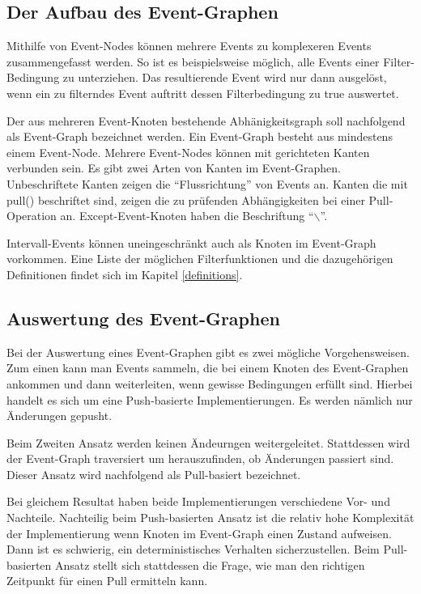 \subsection{Der Aufbau des Event-Graphen}
Mithilfe von Event-Nodes können mehrere Events zu komplexeren Events
zusammengefasst werden. So ist es beispielsweise möglich, alle Events einer
Filter-Bedingung zu unterziehen. Das resultierende Event wird nur dann
ausgelöst, wenn ein zu filterndes Event auftritt dessen Filterbedingung zu true
auswertet. 

Der aus mehreren Event-Knoten bestehende Abhänigkeitsgraph soll nachfolgend als Event-Graph bezeichnet werden. Ein Event-Graph besteht aus mindestens einem Event-Node. 
Mehrere Event-Nodes können mit gerichteten Kanten verbunden sein. Es gibt zwei Arten von Kanten im Event-Graphen. Unbeschriftete Kanten
zeigen die ``Flussrichtung'' von Events an. Kanten die mit pull() beschriftet
sind, zeigen die zu prüfenden Abhängigkeiten bei einer Pull-Operation an.
Except-Event-Knoten haben die Beschriftung ``$\backslash$''.

Intervall-Events können uneingeschränkt auch als Knoten im Event-Graph
vorkommen. Eine Liste der möglichen Filterfunktionen und die dazugehörigen
Definitionen findet sich im Kapitel \ref{definitions}.

\subsection{Auswertung des Event-Graphen}

Bei der Auswertung eines Event-Graphen gibt es zwei mögliche Vorgehensweisen.
Zum einen kann man Events sammeln, die bei einem Knoten des Event-Graphen
ankommen und dann weiterleiten, wenn gewisse Bedingungen erfüllt sind. Hierbei handelt es sich um
eine Push-basierte Implementierungen. Es werden nämlich nur Änderungen gepusht.

Beim Zweiten Ansatz werden keinen Ändeurngen weitergeleitet. Stattdessen wird
der Event-Graph traversiert um herauszufinden, ob Änderungen passiert sind. Dieser
Ansatz wird nachfolgend als Pull-basiert bezeichnet.

Bei gleichem Resultat haben beide Implementierungen verschiedene Vor- und
Nachteile. Nachteilig beim Push-basierten Ansatz ist die relativ hohe Komplexität
der Implementierung wenn Knoten im Event-Graph einen Zustand aufweisen.
Dann ist es schwierig, ein deterministisches Verhalten sicherzustellen. Beim
Pull-basierten Ansatz stellt sich stattdessen die Frage, wie man den richtigen
Zeitpunkt für einen Pull ermitteln kann. 

